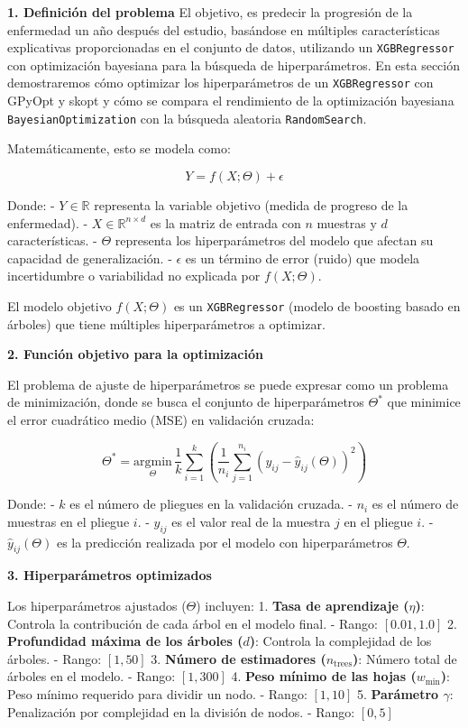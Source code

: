 \documentclass[
  12pt,
  letterpaper,
  DIV=11,
  numbers=noendperiod]{scrartcl}
\begin{document}
\textbf{1. Definición del problema} El objetivo, es predecir la
progresión de la enfermedad un año después del estudio, basándose en
múltiples características explicativas proporcionadas en el conjunto de
datos, utilizando un \texttt{XGBRegressor} con optimización bayesiana
para la búsqueda de hiperparámetros. En esta sección demostraremos cómo
optimizar los hiperparámetros de un \texttt{XGBRegressor} con GPyOpt y
skopt y cómo se compara el rendimiento de la optimización bayesiana
\texttt{BayesianOptimization} con la búsqueda aleatoria
\texttt{RandomSearch}.

Matemáticamente, esto se modela como:

\[
Y = f(X; \Theta) + \epsilon
\]

Donde: - \(Y \in \mathbb{R}\) representa la variable objetivo (medida de
progreso de la enfermedad). - \(X \in \mathbb{R}^{n \times d}\) es la
matriz de entrada con \(n\) muestras y \(d\) características. -
\(\Theta\) representa los hiperparámetros del modelo que afectan su
capacidad de generalización. - \(\epsilon\) es un término de error
(ruido) que modela incertidumbre o variabilidad no explicada por
\(f(X; \Theta)\).

El modelo objetivo \(f(X; \Theta)\) es un \texttt{XGBRegressor} (modelo
de boosting basado en árboles) que tiene múltiples hiperparámetros a
optimizar.

\textbf{2. Función objetivo para la optimización}

El problema de ajuste de hiperparámetros se puede expresar como un
problema de minimización, donde se busca el conjunto de hiperparámetros
\(\Theta^*\) que minimice el error cuadrático medio (MSE) en validación
cruzada:

\[
\Theta^* = \underset{\Theta}{\text{argmin}} \, \frac{1}{k} \sum_{i=1}^{k} \left( \frac{1}{n_i} \sum_{j=1}^{n_i} \left( y_{ij} - \hat{y}_{ij}(\Theta) \right)^2 \right)
\]

Donde: - \(k\) es el número de pliegues en la validación cruzada. -
\(n_i\) es el número de muestras en el pliegue \(i\). - \(y_{ij}\) es el
valor real de la muestra \(j\) en el pliegue \(i\). -
\(\hat{y}_{ij}(\Theta)\) es la predicción realizada por el modelo con
hiperparámetros \(\Theta\).

\textbf{3. Hiperparámetros optimizados}

Los hiperparámetros ajustados (\(\Theta\)) incluyen: 1. \textbf{Tasa de
aprendizaje (\(\eta\))}: Controla la contribución de cada árbol en el
modelo final. - Rango: \([0.01, 1.0]\) 2. \textbf{Profundidad máxima de
los árboles (\(d\))}: Controla la complejidad de los árboles. - Rango:
\([1, 50]\) 3. \textbf{Número de estimadores (\(n_{\text{trees}}\))}:
Número total de árboles en el modelo. - Rango: \([1, 300]\) 4.
\textbf{Peso mínimo de las hojas (\(w_{\text{min}}\))}: Peso mínimo
requerido para dividir un nodo. - Rango: \([1, 10]\) 5.
\textbf{Parámetro \(\gamma\)}: Penalización por complejidad en la
división de nodos. - Rango: \([0, 5]\)
\end{document}
